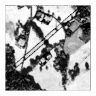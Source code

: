 \documentclass[usenames,dvipsnames,10pt]{beamer}
\begin{document}
\begin{frame}
\begin{minipage}[]{0.3\textwidth}
	\includegraphics[width=\textwidth]{graphics/tfcn-output-03.jpg}
\end{minipage}
\end{frame}
\end{document}
